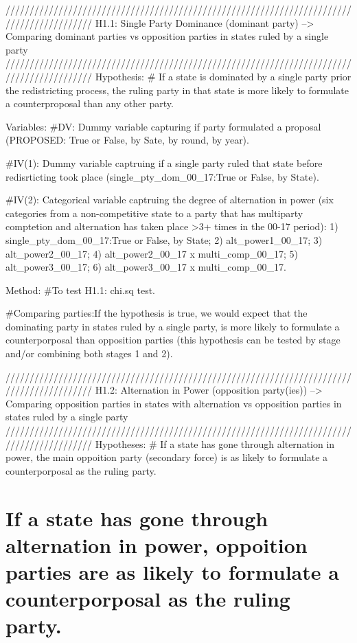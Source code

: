 \documentclass[]{article}
\begin{document}
//////////////////////////////////////////////////////////////////////////////////////////
H1.1: Single Party Dominance (dominant party) --\textgreater{} Comparing
dominant parties vs opposition parties in states ruled by a single party
//////////////////////////////////////////////////////////////////////////////////////////
Hypothesis: \# If a state is dominated by a single party prior the
redistricting process, the ruling party in that state is more likely to
formulate a counterproposal than any other party.

Variables: \#DV: Dummy variable capturing if party formulated a proposal
(PROPOSED: True or False, by Sate, by round, by year).

\#IV(1): Dummy variable captruing if a single party ruled that state
before redisrticting took place (single\_pty\_dom\_00\_17:True or False,
by State).

\#IV(2): Categorical variable captruing the degree of alternation in
power (six categories from a non-competitive state to a party that has
multiparty comptetion and alternation has taken place \textgreater{}3+
times in the 00-17 period): 1) single\_pty\_dom\_00\_17:True or False,
by State; 2) alt\_power1\_00\_17; 3) alt\_power2\_00\_17; 4)
alt\_power2\_00\_17 x multi\_comp\_00\_17; 5) alt\_power3\_00\_17; 6)
alt\_power3\_00\_17 x multi\_comp\_00\_17.

Method: \#To test H1.1: chi.sq test.

\#Comparing parties:If the hypothesis is true, we would expect that the
dominating party in states ruled by a single party, is more likely to
formulate a counterporposal than opposition parties (this hypothesis can
be tested by stage and/or combining both stages 1 and 2).

//////////////////////////////////////////////////////////////////////////////////////////
H1.2: Alternation in Power (opposition party(ies)) --\textgreater{}
Comparing opposition parties in states with alternation vs opposition
parties in states ruled by a single party
//////////////////////////////////////////////////////////////////////////////////////////
Hypotheses: \# If a state has gone through alternation in power, the
main oppoition party (secondary force) is as likely to formulate a
counterporposal as the ruling party.

\hypertarget{if-a-state-has-gone-through-alternation-in-power-oppoition-parties-are-as-likely-to-formulate-a-counterporposal-as-the-ruling-party.}{%
\section{If a state has gone through alternation in power, oppoition
parties are as likely to formulate a counterporposal as the ruling
party.}\label{if-a-state-has-gone-through-alternation-in-power-oppoition-parties-are-as-likely-to-formulate-a-counterporposal-as-the-ruling-party.}}
\end{document}
